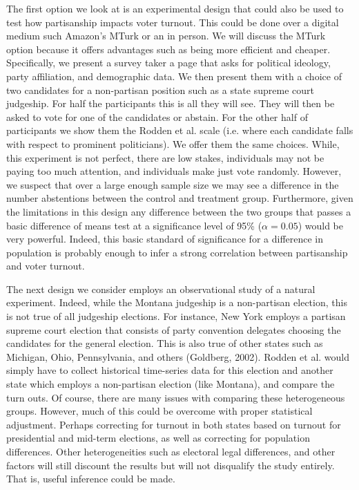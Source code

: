 \documentclass[12pt]{article}
\begin{document}
The first option we look at is an experimental design that could also be used to test how partisanship impacts voter turnout. This could be done over a digital medium such Amazon’s MTurk or an in person. We will discuss the MTurk option because it offers advantages such as being more efficient and cheaper. Specifically, we present a survey taker a page that asks for political ideology, party affiliation, and demographic data. We then present them with a choice of two candidates for a non-partisan position such as a state supreme court judgeship. For half the participants this is all they will see. They will then be asked to vote for one of the candidates or abstain. For the other half of participants we show them the Rodden et al. scale (i.e. where each candidate falls with respect to prominent politicians). We offer them the same choices. While, this experiment is not perfect, there are low stakes, individuals may not be paying too much attention, and individuals make just vote randomly. However, we suspect that over a large enough sample size we may see a difference in the number abstentions between the control and treatment group. Furthermore, given the limitations in this design any difference between the two groups that passes a basic difference of means test at a significance level of 95\% ($\alpha = 0.05$) would be very powerful. Indeed, this basic standard of significance for a difference in population is probably enough to infer a strong correlation between partisanship and voter turnout.

The next design we consider employs an observational study of a natural experiment. Indeed, while the Montana judgeship is a non-partisan election, this is not true of all judgeship elections. For instance, New York employs a partisan supreme court election that consists of party convention delegates choosing the candidates for the general election. This is also true of other states such as Michigan, Ohio, Pennsylvania, and others (Goldberg, 2002). Rodden et al. would simply have to collect historical time-series data for this election and another state which employs a non-partisan election (like Montana), and compare the turn outs. Of course, there are many issues with comparing these heterogeneous groups. However, much of this could be overcome with proper statistical adjustment. Perhaps correcting for turnout in both states based on turnout for presidential and mid-term elections, as well as correcting for population differences. Other heterogeneities such as electoral legal differences, and other factors will still discount the results but will not disqualify the study entirely. That is, useful inference could be made. 
\end{document}

